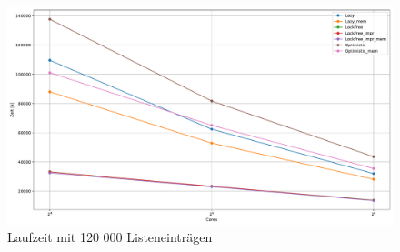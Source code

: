 \begin{figure}[ht!]
	\centering
	\includegraphics[width=1.0\linewidth]{./plots_pdf/mixed_time_cores_120000.pdf} 
	\caption{Laufzeit mit 120 000 Listeneinträgen}
	\label{fig:mixed_time_cores_120000} 
\end{figure}